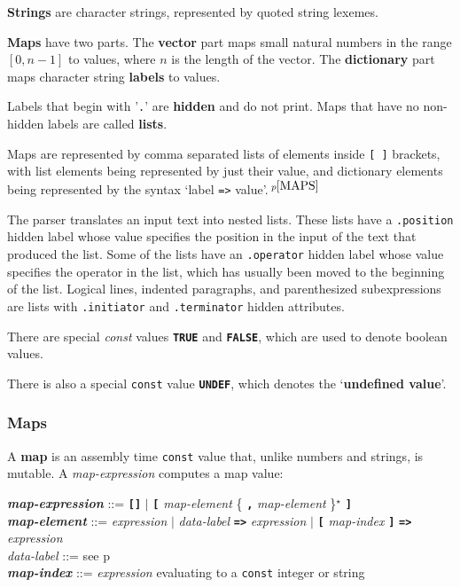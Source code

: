 \documentclass[12pt]{article}
\newcommand{\TT}[1]{{\tt \bfseries #1}}
\newcommand{\STAR}{{\Large $^\star$}}
\newcommand{\key}[1]{{\rm \bfseries #1}}
\newcommand{\ttkey}[1]{{\tt \bfseries #1}}
\newcommand{\emkey}[1]{{\em \bfseries #1}}
\newcommand{\pagref}[1]{p\pageref{#1}}
\newcommand{\pagnote}[1]{$\,^{p\pageref{#1}}$}
\newenvironment{indpar}[1][0.3in]%
	{\begin{list}{}%
		     {\setlength{\itemsep}{0in}%
		      \setlength{\topsep}{0in}%
		      \setlength{\parsep}{1ex}%
		      \setlength{\labelwidth}{#1}%
		      \setlength{\leftmargin}{#1}%
		      \addtolength{\leftmargin}{\labelsep}}%
	 \item}%
	{\end{list}}
\begin{document}
\key{Strings} are character strings, represented by quoted string lexemes.

\key{Maps} have two parts.  The \key{vector} part maps small
natural numbers in the range $[0,n-1]$ to values, where $n$
is the length of the vector.  The \key{dictionary} part maps
character string \key{labels} to values.

Labels that begin with '{\tt .}' are \key{hidden} and do not
print.  Maps that have no non-hidden labels are called \key{lists}.

Maps are represented by comma separated lists of elements inside
{\tt [~]} brackets, with list elements being represented by
just their value, and dictionary elements being represented
by the syntax `label {\tt =>} value'.\pagnote{MAPS}

The parser translates an input text into nested lists.  These
lists have a {\tt .position} hidden label whose value specifies
the position in the input of the text that produced the list.
Some of the lists have an {\tt .operator} hidden label whose
value specifies the operator in the list, which has usually
been moved to the beginning of the list.  Logical lines,
indented paragraphs, and parenthesized subexpressions
are lists with {\tt .initiator} and {\tt .terminator}
hidden attributes.

There are special {\em const} values \ttkey{TRUE} and
\ttkey{FALSE}, which are used to denote boolean values.

There is also a special {\tt const} value \ttkey{UNDEF},
which denotes the `\key{undefined value}'.

\subsubsection{Maps}
\label{MAPS}

A \key{map} is an assembly time {\tt const} value that, unlike
numbers and strings, is mutable.
A {\em map-expression} computes a map value:

\begin{indpar}
\emkey{map-expression} ::=
    \TT{[]} $|$
    \TT{[} {\em map-element} \{ \TT{,} {\em map-element} \}\STAR{} \TT{]}
\\[0.5ex]
\emkey{map-element} ::=
        {\em expression} $|$ {\em data-label} \TT{=>} {\em expression}
	                 $|$ \TT{[} {\em map-index} \TT{]}
			 	\TT{=>} {\em expression}
\\[0.5ex]
{\em data-label} ::= see \pagref{DATA-LABEL}
\\[0.5ex]
\emkey{map-index} ::=
    {\em expression} evaluating to a {\tt const} integer or string
\end{indpar}
\end{document}
